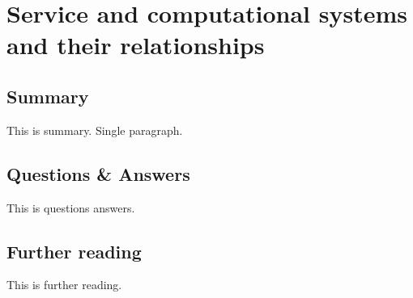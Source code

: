 \section{Service and computational systems and their relationships}

\subsection{Summary}
This is summary. Single paragraph.

\subsection{Questions \& Answers}
This is questions answers.

\subsection{Further reading}
This is further reading.
